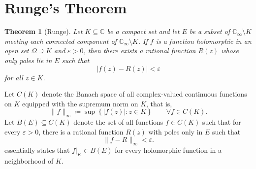 \documentclass[11pt]{article}
\theoremstyle{thmstyle}
\newtheorem{theorem}{Theorem}[section]
\theoremstyle{defstyle}
\newcommand{\bbC}{\mathbb{C}}
\begin{document}
\section{Runge's Theorem}

\begin{theorem}[Runge]
    Let $K\subseteq\bbC$ be a compact set and let $E$ be a subset of $\bbC_\infty\setminus K$ meeting each connected component of $\bbC_\infty\setminus K$. If $f$ is a function holomorphic in an open set $\Omega\supseteq K$ and $\varepsilon > 0$, then there exists a rational function $R(z)$ whose only poles lie in $E$ such that 
    \begin{equation*}
        |f(z) - R(z)| < \varepsilon
    \end{equation*}
    for all $z\in K$.
\end{theorem}

Let $C(K)$ denote the Banach space of all complex-valued continuous functions on $K$ equipped with the supremum norm on $K$, that is, 
\begin{equation*}
    \|f\|_\infty\coloneq\sup\left\{|f(z)|\colon z\in K\right\}\qquad\forall f\in C(K).
\end{equation*}
Let $B(E)\subseteq C(K)$ denote the set of all functions $f\in C(K)$ such that for every $\varepsilon > 0$, there is a rational function $R(z)$ with poles only in $E$ such that 
\begin{equation*}
    \|f - R\|_\infty < \varepsilon.
\end{equation*}
 essentially states that $f|_K\in B(E)$ for every holomorphic function in a neighborhood of $K$.
\end{document}
